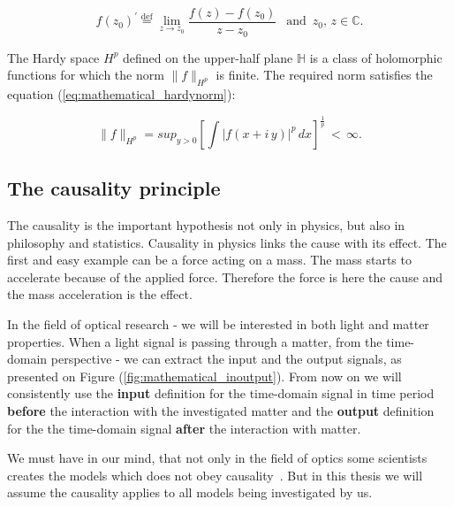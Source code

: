 \documentclass[12pt,twoside,a4paper]{article}
\numberwithin{equation}{subsection}
\numberwithin{figure}{subsection}
\begin{document}
\begin{equation} \label{eq:mathematical_complexderivative}
  f(z_0)^{'} \stackrel{\mathrm{def}}{=} \lim_{z \to z_0} \frac{f(z) - f(z_0)}{z - z_0} \; \, \text{ and } \, z_0, \, z \in \mathbb{C} .
\end{equation}

The Hardy space $ H^{p} $ defined on the upper-half plane $ \mathbb{H} $ is a class of holomorphic functions for which the norm $
\|f\|_{H^p} $ is finite. The required norm satisfies the equation (\ref{eq:mathematical_hardynorm}):

\begin{equation} \label{eq:mathematical_hardynorm}
  \|f\|_{H^p} = sup_{ y > 0 } \left[ \int |f(x + i \, y)|^{p} \, dx \right]^{\frac{1}{p}} \, < \, \infty.
\end{equation}

\subsection{The causality principle} \label{chap:mathematical_causality}

The causality is the important hypothesis not only in physics, but also in philosophy and statistics. Causality in physics links the cause
with its effect. The first and easy example can be a force acting on a mass. The mass starts to accelerate because of the applied force.
Therefore the force is here the cause and the mass acceleration is the effect.

In the field of optical research - we will be interested in both light and matter properties. When a light signal is passing through a
matter, from the time-domain perspective - we can extract the input and the output signals, as presented on Figure
(\ref{fig:mathematical_inoutput}). From now on we will consistently use the \textbf{input} definition for the time-domain signal in time
period \textbf{before} the interaction with the investigated matter and the \textbf{output} definition for the the time-domain signal
\textbf{after} the interaction with matter.

 We must have in our mind, that not only in the field of optics some scientists creates the models which does not obey
 causality~\cite{mukamel_causal}. But in this thesis we will assume the causality applies to all models being investigated by us.
\end{document}
